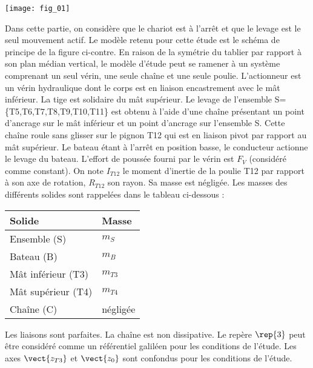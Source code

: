 \begin{marginfigure}
\texttt{[image: fig\_01]}
\end{marginfigure}

Dans cette partie, on considère que le chariot est à l’arrêt et que le levage est le seul mouvement actif. Le modèle retenu pour cette étude est le schéma de principe de la figure ci-contre. En raison de la symétrie du tablier par rapport à son plan médian vertical, le modèle d’étude peut se ramener à un système comprenant un seul vérin, une seule chaîne et une seule poulie.%
L’actionneur est un vérin hydraulique dont le corps est en liaison encastrement avec le mât inférieur. La tige est solidaire du mât supérieur. Le levage de l’ensemble S=\{T5,T6,T7,T8,T9,T10,T11\} est obtenu à l’aide d’une chaîne présentant un point d’ancrage sur le mât inférieur et un point d’ancrage sur l’ensemble S. Cette chaîne roule sans glisser sur le pignon T12 qui est en liaison pivot par rapport au mât supérieur.
Le bateau étant à l’arrêt en position basse, le conducteur actionne le levage du bateau.
L’effort de poussée fourni par le vérin est $F_V$ (considéré comme constant). 
On note $I_{T12}$ le moment d’inertie de la poulie T12 par rapport à son axe de rotation, $R_{T12}$ son rayon. Sa masse est négligée.
Les masses des différents solides sont rappelées dans le tableau ci-dessous :

\begin{marginfigure}[-.5cm]
\begin{tabular}{ll}
\hline 
Solide & Masse \\
\hline
Ensemble (S) & $m_S$ \\ \hline
Bateau (B) & $m_B$ \\ \hline
Mât inférieur (T3) & $m_{T3}$ \\ \hline
Mât supérieur (T4) & $m_{T4}$ \\ \hline
Chaîne (C) & négligée \\ \hline
\end{tabular}
\end{marginfigure}

Les liaisons sont parfaites. La chaîne est non dissipative. Le repère $\rep{3}$ peut être considéré comme un référentiel galiléen pour les conditions de l’étude. Les axes $\vect{z_{T3}}$ et $\vect{z_{0}}$ sont confondus pour les conditions de l’étude.

